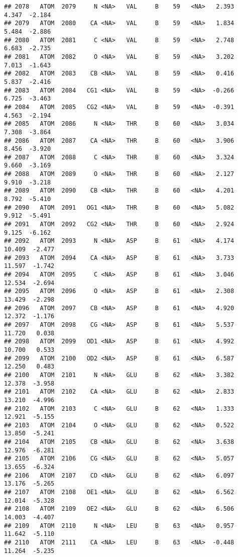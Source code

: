\documentclass[
]{article}
\begin{document}
\begin{verbatim}
## 2078   ATOM  2079     N <NA>   VAL     B    59   <NA>   2.393   4.347  -2.184
## 2079   ATOM  2080    CA <NA>   VAL     B    59   <NA>   1.834   5.484  -2.886
## 2080   ATOM  2081     C <NA>   VAL     B    59   <NA>   2.748   6.683  -2.735
## 2081   ATOM  2082     O <NA>   VAL     B    59   <NA>   3.202   7.013  -1.643
## 2082   ATOM  2083    CB <NA>   VAL     B    59   <NA>   0.416   5.837  -2.416
## 2083   ATOM  2084   CG1 <NA>   VAL     B    59   <NA>  -0.266   6.725  -3.463
## 2084   ATOM  2085   CG2 <NA>   VAL     B    59   <NA>  -0.391   4.563  -2.194
## 2085   ATOM  2086     N <NA>   THR     B    60   <NA>   3.034   7.308  -3.864
## 2086   ATOM  2087    CA <NA>   THR     B    60   <NA>   3.906   8.456  -3.920
## 2087   ATOM  2088     C <NA>   THR     B    60   <NA>   3.324   9.660  -3.169
## 2088   ATOM  2089     O <NA>   THR     B    60   <NA>   2.127   9.910  -3.218
## 2089   ATOM  2090    CB <NA>   THR     B    60   <NA>   4.201   8.792  -5.410
## 2090   ATOM  2091   OG1 <NA>   THR     B    60   <NA>   5.082   9.912  -5.491
## 2091   ATOM  2092   CG2 <NA>   THR     B    60   <NA>   2.924   9.125  -6.162
## 2092   ATOM  2093     N <NA>   ASP     B    61   <NA>   4.174  10.409  -2.477
## 2093   ATOM  2094    CA <NA>   ASP     B    61   <NA>   3.733  11.597  -1.742
## 2094   ATOM  2095     C <NA>   ASP     B    61   <NA>   3.046  12.534  -2.694
## 2095   ATOM  2096     O <NA>   ASP     B    61   <NA>   2.308  13.429  -2.298
## 2096   ATOM  2097    CB <NA>   ASP     B    61   <NA>   4.920  12.372  -1.176
## 2097   ATOM  2098    CG <NA>   ASP     B    61   <NA>   5.537  11.720   0.038
## 2098   ATOM  2099   OD1 <NA>   ASP     B    61   <NA>   4.992  10.700   0.533
## 2099   ATOM  2100   OD2 <NA>   ASP     B    61   <NA>   6.587  12.250   0.483
## 2100   ATOM  2101     N <NA>   GLU     B    62   <NA>   3.382  12.378  -3.958
## 2101   ATOM  2102    CA <NA>   GLU     B    62   <NA>   2.833  13.210  -4.996
## 2102   ATOM  2103     C <NA>   GLU     B    62   <NA>   1.333  12.921  -5.155
## 2103   ATOM  2104     O <NA>   GLU     B    62   <NA>   0.522  13.850  -5.241
## 2104   ATOM  2105    CB <NA>   GLU     B    62   <NA>   3.638  12.976  -6.281
## 2105   ATOM  2106    CG <NA>   GLU     B    62   <NA>   5.057  13.655  -6.324
## 2106   ATOM  2107    CD <NA>   GLU     B    62   <NA>   6.097  13.176  -5.265
## 2107   ATOM  2108   OE1 <NA>   GLU     B    62   <NA>   6.562  12.014  -5.328
## 2108   ATOM  2109   OE2 <NA>   GLU     B    62   <NA>   6.506  14.003  -4.407
## 2109   ATOM  2110     N <NA>   LEU     B    63   <NA>   0.957  11.642  -5.110
## 2110   ATOM  2111    CA <NA>   LEU     B    63   <NA>  -0.448  11.264  -5.235

\end{verbatim}
\end{document}
